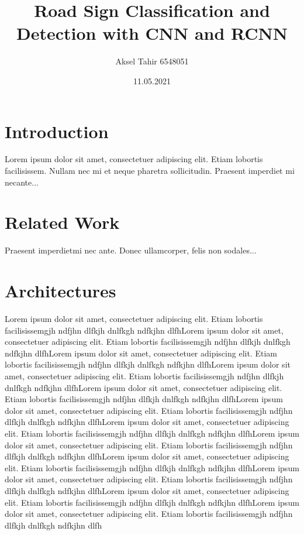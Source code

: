 \documentclass[12pt]{article}
\title{Road Sign Classification and Detection with CNN and RCNN}
\author{Aksel Tahir 6548051}
\date{11.05.2021}
\begin{document}
\maketitle

\tableofcontents

\section{Introduction}

Lorem ipsum dolor sit amet, consectetuer adipiscing elit.  
Etiam lobortis facilisissem.  Nullam nec mi et neque pharetra 
sollicitudin.  Praesent imperdiet mi necante...

\section{Related Work}
Praesent imperdietmi nec ante. Donec ullamcorper, felis non sodales...

\section{Architectures}
Lorem ipsum dolor sit amet, consectetuer adipiscing elit.  
Etiam lobortis facilisissemgjh ndfjhn dlfkjh dnlfkgh ndfkjhn dlfhLorem ipsum dolor sit amet, consectetuer adipiscing elit.  
Etiam lobortis facilisissemgjh ndfjhn dlfkjh dnlfkgh ndfkjhn dlfhLorem ipsum dolor sit amet, consectetuer adipiscing elit.  
Etiam lobortis facilisissemgjh ndfjhn dlfkjh dnlfkgh ndfkjhn dlfhLorem ipsum dolor sit amet, consectetuer adipiscing elit.  
Etiam lobortis facilisissemgjh ndfjhn dlfkjh dnlfkgh ndfkjhn dlfhLorem ipsum dolor sit amet, consectetuer adipiscing elit.  
Etiam lobortis facilisissemgjh ndfjhn dlfkjh dnlfkgh ndfkjhn dlfhLorem ipsum dolor sit amet, consectetuer adipiscing elit.  
Etiam lobortis facilisissemgjh ndfjhn dlfkjh dnlfkgh ndfkjhn dlfhLorem ipsum dolor sit amet, consectetuer adipiscing elit.  
Etiam lobortis facilisissemgjh ndfjhn dlfkjh dnlfkgh ndfkjhn dlfhLorem ipsum dolor sit amet, consectetuer adipiscing elit.  
Etiam lobortis facilisissemgjh ndfjhn dlfkjh dnlfkgh ndfkjhn dlfhLorem ipsum dolor sit amet, consectetuer adipiscing elit.  
Etiam lobortis facilisissemgjh ndfjhn dlfkjh dnlfkgh ndfkjhn dlfhLorem ipsum dolor sit amet, consectetuer adipiscing elit.  
Etiam lobortis facilisissemgjh ndfjhn dlfkjh dnlfkgh ndfkjhn dlfhLorem ipsum dolor sit amet, consectetuer adipiscing elit.  
Etiam lobortis facilisissemgjh ndfjhn dlfkjh dnlfkgh ndfkjhn dlfhLorem ipsum dolor sit amet, consectetuer adipiscing elit.  
Etiam lobortis facilisissemgjh ndfjhn dlfkjh dnlfkgh ndfkjhn dlfh
\end{document}
